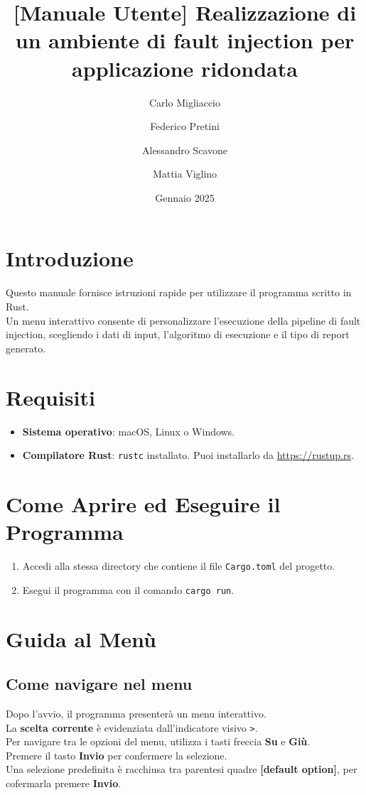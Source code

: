 \documentclass{article}
\title{\textbf{[Manuale Utente] Realizzazione di un ambiente di fault injection per applicazione ridondata}}
\author{Carlo Migliaccio}
\author{Federico Pretini}
\author{Alessandro Scavone}
\author{Mattia Viglino}
\affil[1]{\small{Laurea Magistrale in Ingegneria Informatica, Politecnico di Torino}}
\date{Gennaio 2025}
\begin{document}
\renewcommand{\labelenumii}{\arabic{enumi}.\arabic{enumii}}

\maketitle
\thispagestyle{empty}
\vspace{-0.8cm}
\tableofcontents

\section*{Introduzione}
Questo manuale fornisce istruzioni rapide per utilizzare il programma scritto in Rust. \\
Un menu interattivo consente di personalizzare l'esecuzione della pipeline di fault injection, scegliendo i dati di input, l'algoritmo di esecuzione e il tipo di report generato.

\section*{Requisiti}
\begin{itemize}
\item \textbf{Sistema operativo}: macOS, Linux o Windows.
\item \textbf{Compilatore Rust}: \texttt{rustc} installato. Puoi installarlo da \url{https://rustup.rs}.
\end{itemize}

\section*{Come Aprire ed Eseguire il Programma}
\begin{enumerate}
\item Accedi alla stessa directory che contiene il file \texttt{Cargo.toml} del progetto.
\item Esegui il programma con il comando \texttt{cargo run}.
\end{enumerate}

\section*{Guida al Menù}
\subsection{Come navigare nel menu}
Dopo l'avvio, il programma presenterà un menu interattivo.\\
La \textbf{scelta corrente} è evidenziata dall'indicatore visivo \texttt{>}.\\
Per navigare tra le opzioni del menu, utilizza i tasti freccia \textbf{Su} e \textbf{Giù}.\\
Premere il tasto \textbf{Invio} per confermere la selezione. \\ 
Una selezione predefinita è racchiusa tra parentesi quadre \textbf{[default option]}, per cofermarla premere \textbf{Invio}.
\end{document}
